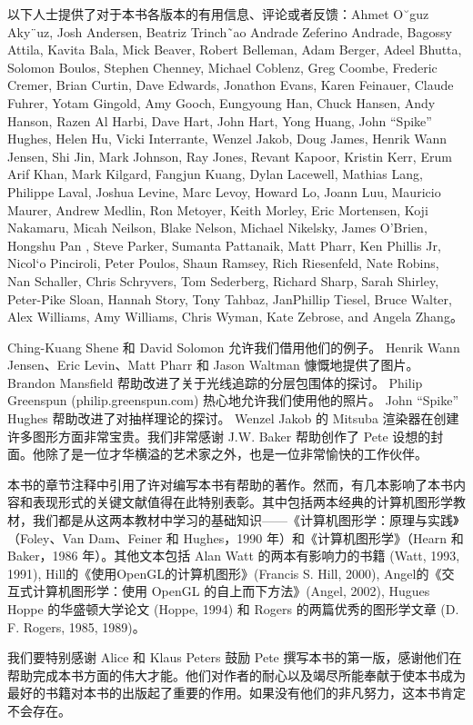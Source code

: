 \documentclass[lang=cn,12pt]{elegantbook}
\begin{document}
以下人士提供了对于本书各版本的有用信息、评论或者反馈：Ahmet O˘guz Aky¨uz, Josh Andersen, Beatriz Trinch˜ao Andrade Zeferino Andrade, Bagossy Attila, Kavita Bala, Mick Beaver, Robert Belleman, Adam Berger, Adeel Bhutta, Solomon Boulos, Stephen Chenney, Michael Coblenz, Greg Coombe, Frederic Cremer, Brian Curtin, Dave Edwards, Jonathon Evans, Karen Feinauer, Claude Fuhrer, Yotam Gingold, Amy Gooch, Eungyoung Han, Chuck Hansen, Andy Hanson, Razen Al Harbi, Dave Hart, John Hart, Yong Huang, John “Spike” Hughes, Helen Hu, Vicki Interrante, Wenzel Jakob, Doug James, Henrik Wann Jensen, Shi Jin, Mark Johnson, Ray Jones, Revant Kapoor, Kristin Kerr, Erum Arif Khan, Mark Kilgard, Fangjun Kuang, Dylan Lacewell, Mathias Lang, Philippe Laval, Joshua Levine, Marc Levoy, Howard Lo, Joann Luu, Mauricio Maurer, Andrew Medlin, Ron Metoyer, Keith Morley, Eric Mortensen, Koji Nakamaru, Micah Neilson, Blake Nelson, Michael Nikelsky, James O’Brien, Hongshu Pan , Steve Parker, Sumanta Pattanaik, Matt Pharr, Ken Phillis Jr, Nicol`o Pinciroli, Peter Poulos, Shaun Ramsey, Rich Riesenfeld, Nate Robins, Nan Schaller, Chris Schryvers, Tom Sederberg, Richard Sharp, Sarah Shirley, Peter-Pike Sloan, Hannah Story, Tony Tahbaz, JanPhillip Tiesel, Bruce Walter, Alex Williams, Amy Williams, Chris Wyman, Kate Zebrose, and Angela Zhang。  

Ching-Kuang Shene 和 David Solomon 允许我们借用他们的例子。 Henrik Wann Jensen、Eric Levin、Matt Pharr 和 Jason Waltman 慷慨地提供了图片。 Brandon Mansfield 帮助改进了关于光线追踪的分层包围体的探讨。 Philip Greenspun (philip.greenspun.com) 热心地允许我们使用他的照片。 John “Spike” Hughes 帮助改进了对抽样理论的探讨。 Wenzel Jakob 的 Mitsuba 渲染器在创建许多图形方面非常宝贵。我们非常感谢 J.W. Baker 帮助创作了 Pete 设想的封面。他除了是一位才华横溢的艺术家之外，也是一位非常愉快的工作伙伴。  

本书的章节注释中引用了许对编写本书有帮助的著作。然而，有几本影响了本书内容和表现形式的关键文献值得在此特别表彰。其中包括两本经典的计算机图形学教材，我们都是从这两本教材中学习的基础知识——《计算机图形学：原理与实践》（Foley、Van Dam、Feiner 和 Hughes，1990 年）和《计算机图形学》（Hearn 和 Baker，1986 年）。其他文本包括 Alan Watt 的两本有影响力的书籍 (Watt, 1993, 1991), Hill的《使用OpenGL的计算机图形》(Francis S. Hill, 2000), Angel的《交互式计算机图形学：使用 OpenGL 的自上而下方法》(Angel, 2002), Hugues Hoppe 的华盛顿大学论文 (Hoppe, 1994) 和 Rogers 的两篇优秀的图形学文章 (D. F. Rogers, 1985, 1989)。  

我们要特别感谢 Alice 和 Klaus Peters 鼓励 Pete 撰写本书的第一版，感谢他们在帮助完成本书方面的伟大才能。他们对作者的耐心以及竭尽所能奉献于使本书成为最好的书籍对本书的出版起了重要的作用。如果没有他们的非凡努力，这本书肯定不会存在。 
\end{document}
